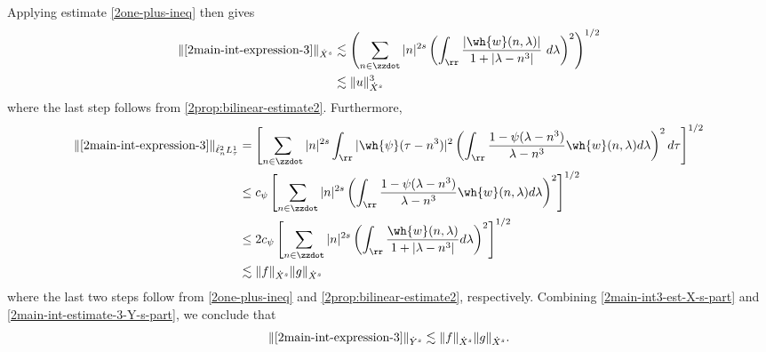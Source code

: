 %
%
Applying estimate \eqref{2one-plus-ineq} then gives
%
\begin{equation}
	\label{2main-int3-est-X-s-part}
	\begin{split}
		\| \eqref{2main-int-expression-3} \|_{\dot{X}^s}
		& \lesssim \left( \sum_{n \in \zzdot} |n|^{2s}  \left ( \int_\rr
		\frac{|\wh{w}(n, \lambda)| }{1 + |\lambda - n^3|}
		 \ d\lambda \right )^2 \right)^{1/2}
		 \\
		& \lesssim \|u\|_{\dot{X}^s}^3
	\end{split}
\end{equation}
%
where the last step follows from \cref{2prop:bilinear-estimate2}.
Furthermore, 
%
%
\begin{equation}
	\label{2main-int-estimate-3-Y-s-part}
	\begin{split}
		\|\eqref{2main-int-expression-3}\|_{\dot{\ell}^2_n L^1_\tau}
		& = \left[ \sum_{n \in \zzdot} |n|^{2s} \int_{\rr} |
		\wh{\psi}(\tau - n^{3}) |^{2} \left( \int_{\rr}\frac{1 - \psi(\lambda -
		n^{3})}{\lambda - n^{3}} \wh{w}(n, \lambda) d \lambda \right)^{2} d \tau
		\right]^{1/2}
		\\
		& \le c_{\psi} \left[ \sum_{n \in \zzdot} |n|^{2s} \left(
		\int_{\rr} \frac{1 - \psi(\lambda - n^{3})}{\lambda - n^{3}}
		\wh{w}(n, \lambda) d \lambda
		\right)^{2}\right]^{1/2}
		\\
		& \le 2 c_{\psi} \left[ \sum_{n \in \zzdot} |n|^{2s} \left(
		\int_{\rr} \frac{\wh{w}(n, \lambda) }{1 + |\lambda - n^{3}|}
		d \lambda
		\right)^{2}\right]^{1/2}
		\\
		& \lesssim \|f\|_{\dot{X}^s} \|g\|_{\dot{X}^s} 
	\end{split}
\end{equation}
%
%
where the last two steps follow from \eqref{2one-plus-ineq} and
\cref{2prop:bilinear-estimate2}, respectively. Combining
\eqref{2main-int3-est-X-s-part} and \eqref{2main-int-estimate-3-Y-s-part}, we
conclude that
%
%
\begin{equation}
	\label{2main-int3-est}
	\begin{split}
		\|\eqref{2main-int-expression-3}\|_{\dot{Y}^s} 
		\lesssim \|f\|_{\dot{X}^s} \|g\|_{\dot{X}^s}.
	\end{split}
\end{equation}
%
%
%
